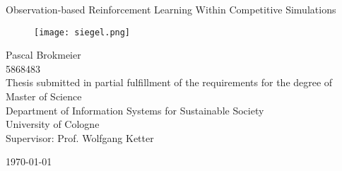 \begin{titlepage}
\setlength{\parindent}{0pt} %
\begin{center}

\Huge{Observation-based Reinforcement Learning Within Competitive Simulations}

\vspace{10mm}
\begin{figure}[!h]
    \centering
    \texttt{[image: siegel.png]}
\end{figure}

\vspace{10mm}

\small{
Pascal Brokmeier \\ 5868483 \\
}
\vspace{5mm}
\small{Thesis submitted in partial fulfillment of the requirements for the degree of Master of Science\\}
\vspace{5mm}
\small{Department of Information Systems for Sustainable Society \\
University of Cologne\\
Supervisor: Prof.  Wolfgang Ketter }

\vspace{5mm}
\today
{}
\end{center}
\end{titlepage}
